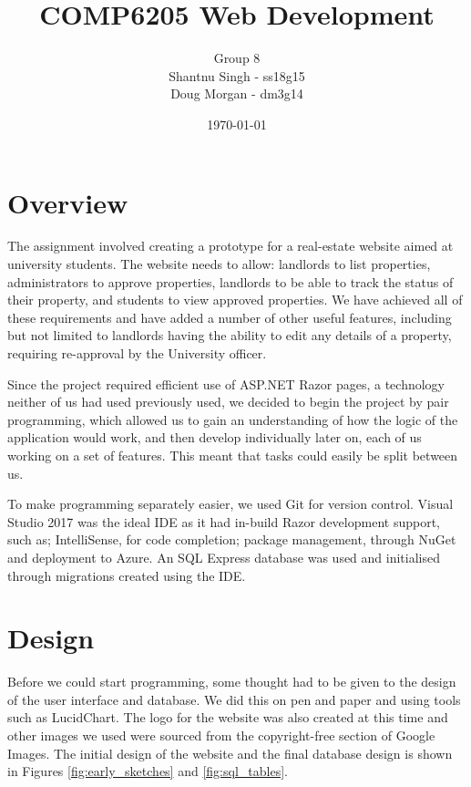\documentclass{article}
\begin{document}
\title{COMP6205 Web Development\\}
\author{Group 8\\Shantnu Singh - ss18g15\\Doug Morgan - dm3g14}
\date{\today}
\maketitle

\section{Overview}
    \par
        The assignment involved creating a prototype for a real-estate website aimed at university students.
        The website needs to allow: landlords to list properties, administrators to approve properties, landlords to be able to track the status of their property, and students to view approved properties.
        We have achieved all of these requirements and have added a number of other useful features, including but not limited to landlords having the ability to edit any details of a property, requiring re-approval by the University officer.

    \par
        Since the project required efficient use of ASP.NET Razor pages, a technology neither of us had used previously used, we decided to begin the project by pair programming, which allowed us to gain an understanding of how the logic of the application would work, and then develop individually later on, each of us working on a set of features.
        This meant that tasks could easily be split between us.

    \par
        To make programming separately easier, we used Git for version control.
        Visual Studio 2017 was the ideal IDE as it had in-build Razor development support, such as; IntelliSense, for code completion; package management, through NuGet and deployment to Azure.
        An SQL Express database was used and initialised through migrations created using the IDE.

\section{Design}
    \par
        Before we could start programming, some thought had to be given to the design of the user interface and database.
        We did this on pen and paper and using tools such as LucidChart.
        The logo for the website was also created at this time and other images we used were sourced from the copyright-free section of Google Images.
        The initial design of the website and the final database design is shown in Figures \ref{fig:early_sketches} and \ref{fig:sql_tables}.
\end{document}
